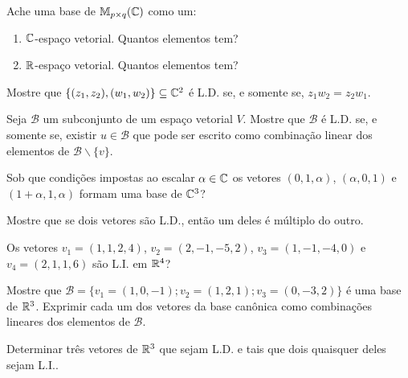 \documentclass[12pt]{exam}
\begin{document}
\begin{exercicio}
  Ache uma base de $\mathbb{M}_{p \times q}(\mathbb{C})$ como um:
  \begin{enumerate}[label={\alph*})]
     \item $\mathbb{C}$-espa\c{c}o vetorial. Quantos elementos tem?
     \item $\mathbb{R}$-espa\c{c}o vetorial. Quantos elementos tem?
   \end{enumerate}
\end{exercicio}

\begin{exercicio}
  Mostre que $\{ (z_1, z_2), (w_1, w_2)\} \subseteq \mathbb{C}^2$ \'e L.D. se, e somente se, $z_1w_2 = z_2w_1$.
\end{exercicio}

\begin{exercicio}
  Seja $\mathcal{B}$ um subconjunto de um espa\c{c}o vetorial $V$. Mostre que $\mathcal{B}$ \'e L.D. se, e somente se, existir $u \in \mathcal{B}$ que pode ser escrito como combina\c{c}\~ao linear dos elementos de $\mathcal{B} \backslash \{v\}$.
\end{exercicio}
\begin{exercicio}
  Sob que condi\c{c}\~oes impostas ao escalar $\alpha \in \mathbb{C}$ os vetores $(0,1,\alpha)$, $(\alpha,0,1)$ e $(1 + \alpha, 1, \alpha)$ formam uma base de $\mathbb{C}^3$?
\end{exercicio}

\begin{exercicio}
  Mostre que se dois vetores s\~ao L.D., ent\~ao um deles \'e m\'ultiplo do outro.
\end{exercicio}

\begin{exercicio}
  Os vetores $v_1 = (1,1,2,4)$, $v_2 = (2,-1,-5,2)$, $v_3 = (1,-1,-4,0)$ e $v_4 = (2,1,1,6)$ s\~ao L.I. em $\mathbb{R}^4$?
\end{exercicio}

\begin{exercicio}
  Mostre que $\mathcal{B} = \{v_1 = (1,0,-1);v_2=(1,2,1);v_3=(0,-3,2)\}$ \'e uma base de $\mathbb{R}^3$. Exprimir cada um dos vetores da base can\^onica como combina\c{c}\~oes lineares dos elementos de $\mathcal{B}$.
\end{exercicio}

\begin{exercicio}
  Determinar tr\^es vetores de $\mathbb{R}^3$ que sejam L.D. e tais que dois quaisquer deles sejam L.I..
\end{exercicio}
\end{document}
